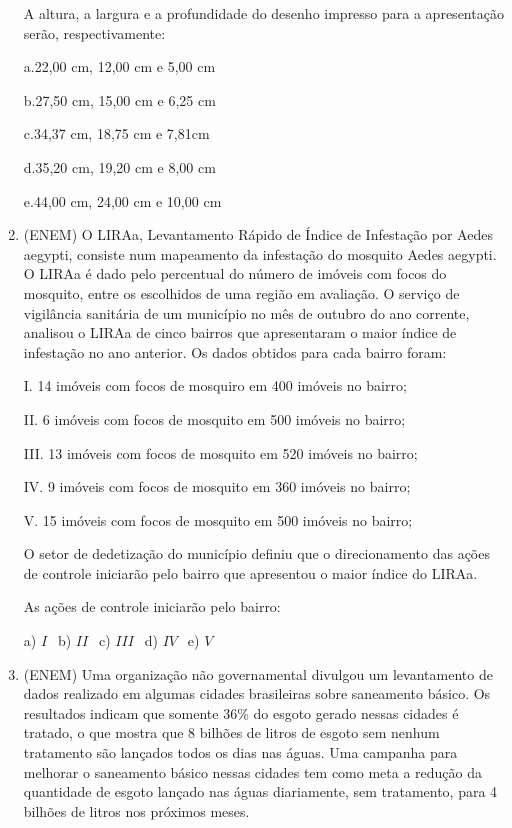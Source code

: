 \begin{multicols*}{2}
\begin{enumerate}
A altura, a largura e a profundidade do desenho impresso para a apresentação serão, respectivamente:

a.22,00 cm, 12,00 cm e 5,00 cm

b.27,50 cm, 15,00 cm e 6,25 cm

c.34,37 cm, 18,75 cm e 7,81cm

d.35,20 cm, 19,20 cm e 8,00 cm

e.44,00 cm, 24,00 cm e 10,00 cm

		\item (ENEM) O LIRAa, Levantamento Rápido de Índice de Infestação por Aedes aegypti, consiste num mapeamento da infestação do mosquito Aedes aegypti. O LIRAa é dado pelo percentual do número de imóveis com focos do mosquito, entre os escolhidos de uma região em avaliação. O serviço de vigilância sanitária de um município no mês de outubro do ano corrente, analisou o LIRAa de cinco bairros que apresentaram o maior índice de infestação no ano anterior. Os dados obtidos para cada bairro foram:

I. 14 imóveis com focos de mosquiro em 400 imóveis no bairro;

II. 6 imóveis com focos de mosquito em 500 imóveis no bairro;

III. 13 imóveis com focos de mosquito em 520 imóveis no bairro;

IV. 9 imóveis com focos de mosquito em 360 imóveis no bairro;

V. 15 imóveis com focos de mosquito em 500 imóveis no bairro;

O setor de dedetização do município definiu que o direcionamento das ações de controle iniciarão pelo bairro
que apresentou o maior índice do LIRAa.

As ações de controle iniciarão pelo bairro:

		a) $ I \ \ $ b) $ II \ \ $ c) $III \ \ $ d) $ IV \ \ $ e) $ V \ \ $

		\item (ENEM) Uma organização não governamental divulgou um levantamento de dados realizado em algumas cidades
brasileiras sobre saneamento básico. Os resultados indicam que somente 36\% do esgoto gerado nessas cidades é tratado, o que mostra que 8 bilhões de litros de esgoto sem nenhum tratamento são lançados todos os dias nas águas. Uma campanha para melhorar o saneamento básico nessas cidades tem como meta a redução da quantidade de esgoto lançado nas águas diariamente, sem tratamento, para 4 bilhões de litros nos próximos meses.


\end{enumerate}
\end{multicols*}
